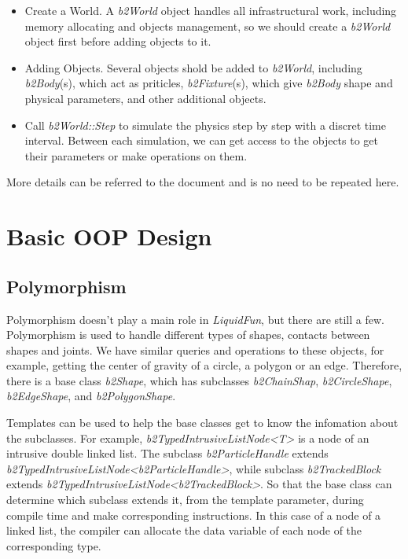 \documentclass[UTF8]{ctexart}
\begin{document}
            \begin{itemize}
                \item Create a World. A \textit{b2World} object handles all infrastructural work, including memory allocating and objects management, so we should create a \textit{b2World} object first before adding objects to it.
                \item Adding Objects. Several objects shold be added to \textit{b2World}, including \textit{b2Body}(s), which act as priticles, \textit{b2Fixture}(s), which give \textit{b2Body} shape and physical parameters, and other additional objects.
                \item Call \textit{b2World::Step} to simulate the physics step by step with a discret time interval. Between each simulation, we can get access to the objects to get their parameters or make operations on them.
            \end{itemize}

            More details can be referred to the document and is no need to be repeated here.

    \section{Basic OOP Design}

        \subsection{Polymorphism}

            Polymorphism doesn't play a main role in \textit{LiquidFun}, but there are still a few. Polymorphism is used to handle different types of shapes, contacts between shapes and joints. We have similar queries and operations to these objects, for example, getting the center of gravity of a circle, a polygon or an edge. Therefore, there is a base class \textit{b2Shape}, which has subclasses \textit{b2ChainShap}, \textit{b2CircleShape}, \textit{b2EdgeShape}, and \textit{b2PolygonShape}.

            Templates can be used to help the base classes get to know the infomation about the subclasses. For example, \textit{b2TypedIntrusiveListNode<T>} is a node of an intrusive double linked list. The subclass \textit{b2ParticleHandle} extends \textit{b2TypedIntrusiveListNode<b2ParticleHandle>}, while subclass \textit{b2TrackedBlock} extends \textit{b2TypedIntrusiveListNode<b2TrackedBlock>}. So that the base class can determine which subclass extends it, from the template parameter, during compile time and make corresponding instructions. In this case of a node of a linked list, the compiler can allocate the data variable of each node of the corresponding type.
\end{document}
